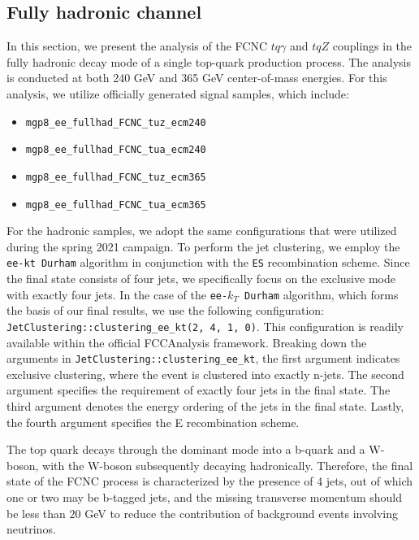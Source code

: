\documentclass[11pt,onecolumn,english,showpacs,preprintnumbers,amsmath,amssymb,floatfix,nofootinbib]{revtex4-1}
\begin{document}
\subsection{Fully hadronic channel}\label{Fully-hadronic-channel}
%
In this section, we present the analysis of the FCNC $tq\gamma$ and $tqZ$ couplings in the fully hadronic decay mode of a single top-quark production process. The analysis is conducted at both 240 GeV and 365 GeV center-of-mass energies.
For this analysis, we utilize officially generated signal samples, which include: 
\begin{itemize}
\item  {\tt mgp8\_ee\_fullhad\_FCNC\_tuz\_ecm240}
\item  {\tt mgp8\_ee\_fullhad\_FCNC\_tua\_ecm240} 
\item  {\tt mgp8\_ee\_fullhad\_FCNC\_tuz\_ecm365}
\item  {\tt mgp8\_ee\_fullhad\_FCNC\_tua\_ecm365} 
\end{itemize}
For the hadronic samples, we adopt the same configurations that were utilized during the spring 2021 campaign.
To perform the jet clustering, we employ the {\tt ee-kt Durham} algorithm in conjunction with the {\tt ES} recombination scheme. Since the final state consists of four jets, we specifically focus on the exclusive mode with exactly four jets. In the case of the {\tt ee-$k_T$ Durham} algorithm, which forms the basis of our final results, we use the following configuration: {\tt JetClustering::clustering\_ee\_kt(2, 4, 1, 0)}. This configuration is readily available within the official FCCAnalysis framework.
Breaking down the arguments in {\tt JetClustering::clustering\_ee\_kt}, the first argument indicates exclusive clustering, where the event is clustered into exactly n-jets. The second argument specifies the requirement of exactly four jets in the final state. The third argument denotes the energy ordering of the jets in the final state. Lastly, the fourth argument specifies the E recombination scheme.\par
The top quark decays through the dominant mode into a b-quark and a W-boson, with the W-boson subsequently 
decaying hadronically. Therefore, the final state of the FCNC process is characterized by the presence of 4 jets, 
out of which one or two may be b-tagged jets, and the missing transverse momentum should be less than 
$20$ GeV to reduce the contribution of background events involving neutrinos.
\end{document}
